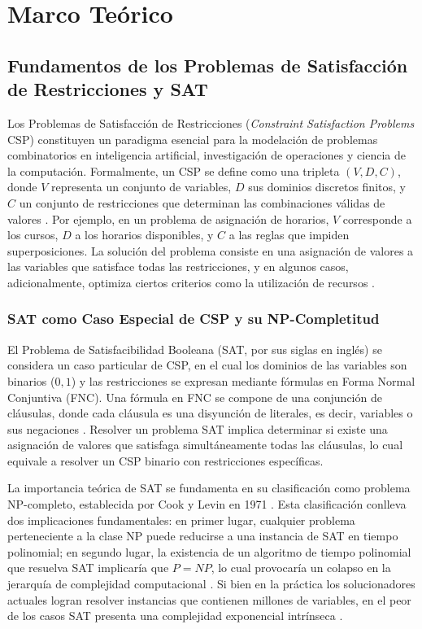 \chapter{Marco Te\'orico}\label{chapter:state-of-the-art}

\section{Fundamentos de los Problemas de Satisfacci\'on de Restricciones y SAT}
\label{sec:fundamentos-sat-csp}

Los Problemas de Satisfacci\'on de Restricciones (\textit{Constraint Satisfaction Problems} CSP) constituyen un paradigma esencial para la modelaci\'on de problemas combinatorios en inteligencia artificial, investigaci\'on de operaciones y ciencia de la computaci\'on. Formalmente, un CSP se define como una tripleta $(V,D,C)$, donde $V$ representa un conjunto de variables, $D$ sus dominios discretos finitos, y $C$ un conjunto de restricciones que determinan las combinaciones v\'alidas de valores \cite{garcia_conferencia1}. Por ejemplo, en un problema de asignaci\'on de horarios, $V$ corresponde a los cursos, $D$ a los horarios disponibles, y $C$ a las reglas que impiden superposiciones. La soluci\'on del problema consiste en una asignaci\'on de valores a las variables que satisface todas las restricciones, y en algunos casos, adicionalmente, optimiza ciertos criterios como la utilizaci\'on de recursos \cite{almabetterCSP}.

\subsection{SAT como Caso Especial de CSP y su NP-Completitud}
El Problema de Satisfacibilidad Booleana (SAT, por sus siglas en ingl\'es) se considera un caso particular de CSP, en el cual los dominios de las variables son binarios (${0,1}$) y las restricciones se expresan mediante f\'ormulas en Forma Normal Conjuntiva (FNC). Una f\'ormula en FNC se compone de una conjunci\'on de cl\'ausulas, donde cada cl\'ausula es una disyunci\'on de literales, es decir, variables o sus negaciones \cite{zulkoski2018understanding}. Resolver un problema SAT implica determinar si existe una asignaci\'on de valores que satisfaga simult\'aneamente todas las cl\'ausulas, lo cual equivale a resolver un CSP binario con restricciones espec\'ificas.

La importancia te\'orica de SAT se fundamenta en su clasificaci\'on como problema NP-completo, establecida por Cook y Levin en 1971 \cite{marques-silva2024cdcl}. Esta clasificaci\'on conlleva dos implicaciones fundamentales: en primer lugar, cualquier problema perteneciente a la clase NP puede reducirse a una instancia de SAT en tiempo polinomial; en segundo lugar, la existencia de un algoritmo de tiempo polinomial que resuelva SAT implicar\'ia que $P=NP$, lo cual provocar\'ia un colapso en la jerarqu\'ia de complejidad computacional  \cite{guo2024progress}. Si bien en la pr\'actica los solucionadores actuales logran resolver instancias que contienen millones de variables, en el peor de los casos SAT presenta una complejidad exponencial intr\'inseca \cite{marques-silva2024cdcl}.

